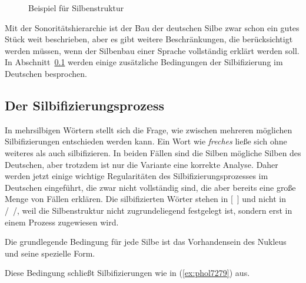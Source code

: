 \begin{figure}
  \centering
  \caption{Beispiel für Silbenstruktur}
  \label{fig:phonstr}
\end{figure}

Mit der Sonoritätshierarchie ist der Bau der deutschen Silbe zwar schon ein gutes Stück weit beschrieben, aber es gibt weitere Beschränkungen, die berücksichtigt werden müssen, wenn der Silbenbau einer Sprache vollständig erklärt werden soll.
In Abschnitt~\ref{sec:silbifizierung} werden einige zusätzliche Bedingungen der Silbifizierung im Deutschen besprochen.

\subsection{Der Silbifizierungsprozess}

\label{sec:silbifizierung}

In mehrsilbigen Wörtern stellt sich die Frage, wie zwischen mehreren möglichen Silbifizierungen entschieden werden kann.
Ein Wort wie \textit{freches} ließe sich ohne weiteres \textipa{[fKE.\c{c}@s]} als auch \textipa{[fKE\c{c}.@s]} silbifizieren.
In beiden Fällen sind die Silben mögliche Silben des Deutschen, aber trotzdem ist nur die Variante \textipa{[fKE.\c{c}@s]} eine korrekte Analyse.
Daher werden jetzt einige wichtige Regularitäten des Silbifizierungsprozesses im Deutschen eingeführt, die zwar nicht vollständig sind, die aber bereits eine große Menge von Fällen erklären.
Die silbifizierten Wörter stehen in [~] und nicht in /~/, weil die Silbenstruktur nicht zugrundeliegend festgelegt ist, sondern erst in einem Prozess zugewiesen wird.

Die grundlegende Bedingung für jede Silbe ist das Vorhandensein des Nukleus und seine spezielle Form.


Diese Bedingung schließt Silbifizierungen wie in (\ref{ex:phol7279}) aus.

